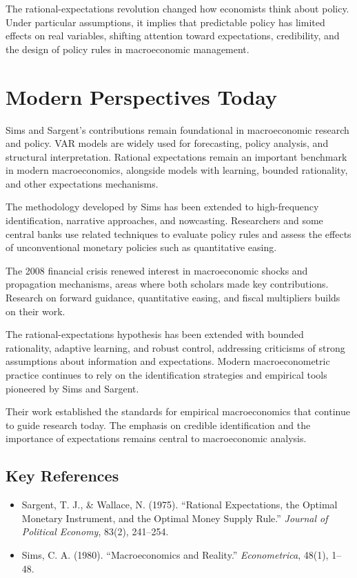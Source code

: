 The rational-expectations revolution changed how economists think about policy.
Under particular assumptions, it implies that predictable policy has limited
effects on real variables, shifting attention toward expectations, credibility,
and the design of policy rules in macroeconomic management.

\section{Modern Perspectives Today}
Sims and Sargent's contributions remain foundational in macroeconomic research and
policy. VAR models are widely used for forecasting, policy analysis, and structural
interpretation. Rational expectations remain an important benchmark in modern
macroeconomics, alongside models with learning, bounded rationality, and other
expectations mechanisms.

The methodology developed by Sims has been extended to high-frequency
identification, narrative approaches, and nowcasting. Researchers and some central
banks use related techniques to evaluate policy rules and assess the effects of
unconventional monetary policies such as quantitative easing.

The 2008 financial crisis renewed interest in macroeconomic shocks and propagation
mechanisms, areas where both scholars made key contributions. Research on forward
guidance, quantitative easing, and fiscal multipliers builds on their work.

The rational-expectations hypothesis has been extended with bounded rationality,
adaptive learning, and robust control, addressing criticisms of strong assumptions
about information and expectations. Modern macroeconometric practice continues to
rely on the identification strategies and empirical tools pioneered by Sims and
Sargent.

Their work established the standards for empirical macroeconomics that continue
to guide research today. The emphasis on credible identification and the
importance of expectations remains central to macroeconomic analysis.

\subsection*{Key References}
\begin{itemize}
    \item Sargent, T. J., \& Wallace, N. (1975). ``Rational Expectations, the Optimal Monetary Instrument, and the Optimal Money Supply Rule.'' \textit{Journal of Political Economy}, 83(2), 241--254.
    \item Sims, C. A. (1980). ``Macroeconomics and Reality.'' \textit{Econometrica}, 48(1), 1--48.
\end{itemize}
